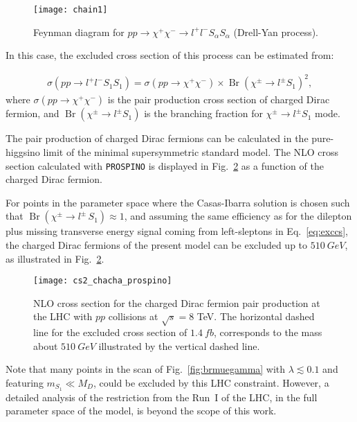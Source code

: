 \begin{figure}[h]
\begin{center}
\texttt{[image: chain1]}
\caption{Feynman diagram for $pp \rightarrow \chi^+\chi^- \rightarrow l^+l^- S_{\alpha}S_{\alpha}$ (Drell-Yan process).}
\label{fig:chain_signal}
\end{center}
\end{figure}

In this case, the excluded cross section of this process can be estimated from:

\begin{align}
\label{eq:exccs}
\sigma(pp \rightarrow l^+l^-S_1 S_1)=\sigma(pp \rightarrow \chi^+\chi^-)\times \operatorname{Br}(\chi^{\pm} \rightarrow l^{\pm}S_1)^2 ,
\end{align}
where $\sigma(pp \rightarrow \chi^+\chi^-)$ is the pair production
cross section of charged Dirac fermion, and
$\operatorname{Br}(\chi^{\pm} \rightarrow l^{\pm}S_1)$ is the
branching fraction for $\chi^{\pm} \rightarrow l^{\pm}S_1$
mode.

The pair production of charged Dirac fermions can be
calculated in the pure-higgsino limit of the minimal supersymmetric
standard model. 
The NLO cross section calculated with \texttt{PROSPINO} is displayed
in Fig.~\ref{fig:chargino_production} as a function of the charged
Dirac fermion.

For points in the parameter space where the Casas-Ibarra solution is
chosen such that $\operatorname{Br}(\chi^\pm\to l^\pm\,S_1)\approx 1$,
and assuming the same efficiency as for the dilepton plus missing
transverse energy signal coming from left-sleptons in
Eq.~\eqref{eq:exccs}, the charged Dirac fermions of the present model
can be excluded up to $\SI{510}{GeV}$, as illustrated in
Fig.~\ref{fig:chargino_production}.

\begin{figure}[h]
\begin{center}
\texttt{[image: cs2\_chacha\_prospino]}
\caption{NLO cross section for the charged Dirac fermion pair
  production at the LHC with $pp$ collisions at $\sqrt{s}=8$ TeV. 
  The horizontal dashed line for the excluded cross section of
  $\SI{1.4}{fb}$, corresponds to the mass about $\SI{510}{GeV}$
  illustrated by the vertical dashed line.}
\label{fig:chargino_production}
\end{center}
\end{figure}

Note that many points in the scan of Fig.~\ref{fig:brmuegamma} with
$\lambda\lesssim 0.1$ and featuring $m_{S_1}\ll M_D$, could be
excluded by this LHC constraint. 
However, a detailed analysis of the restriction from the Run~I of the
LHC, in the full parameter space of the model, is beyond the scope of this
work.

